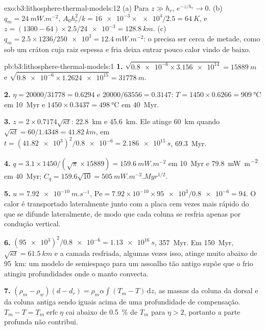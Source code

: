 \begin{solution}{exo:b3:lithosphere-thermal-models:12}
(a) Para $z \gg h_r$, $e^{-z/h_r} \to 0$. (b) $q_m = \qty{24}{mW.m^{-2}}$,
$A_0h_r^2/k = \num{16e-3}\times\num{e4}/2.5 = \qty{64}{K}$, e $z = (1300 -
64)\times2.5/\num{24e-3} = \qty{128.8}{km}$. (c) $q_m = 2.5\times1236/\num{250e3}
= \qty{12.4}{mW.m^{-2}}$: o  precisa ser cerca de metade, como sob um
cráton cuja raiz espessa e fria deixa entrar pouco calor vindo de baixo.
\end{solution}

\begin{solution}{pb:b3:lithosphere-thermal-models:1}
\textbf{1.} $\sqrt{\num{0.8e-6}\times\num{3.156e14}} = \qty{15889}{m}$ e
$\sqrt{\num{0.8e-6}\times\num{1.2624e15}} = \qty{31778}{m}$.

\textbf{2.} $\eta = 20000/31778 = 0.6294$ e $20000/63556 = 0.3147$:
$T = 1450\times0.6266 = \qty{909}{\celsius}$ em \qty{10}{Myr} e
$1450\times0.3437 = \qty{498}{\celsius}$ em \qty{40}{Myr}.

\textbf{3.} $z = 2\times0.7174\sqrt{\kappa t}$: \qty{22.8}{km} e
\qty{45.6}{km}. Ele atinge \qty{60}{km} quando $\sqrt{\kappa t} = 60/1.4348 =
\qty{41.82}{km}$, em $t = (\num{41.82e3})^2/\num{0.8e-6} = \qty{2.186e15}{s}$,
\qty{69.3}{Myr}.

\textbf{4.} $q = 3.1\times1450/(\sqrt\pi\times15889) = \qty{159.6}{mW.m^{-2}}$ em
\qty{10}{Myr} e \qty{79.8}{mW.m^{-2}} em \qty{40}{Myr}; $C_q = 159.6\sqrt{10}
= \qty{505}{mW.m^{-2}.Myr^{1/2}}$.

\textbf{5.} $u = \qty{7.92e-10}{m.s^{-1}}$, $\mathrm{Pe} = 7.92\times10^{-10}
\times\num{95e3}/\num{0.8e-6} = 94$. O calor é transportado lateralmente junto com a placa cem
vezes mais rápido do que se difunde lateralmente, de modo que cada coluna se resfria
apenas por condução vertical.

\textbf{6.} $(\num{95e3})^2/\num{0.8e-6} = \qty{1.13e16}{s}$, \qty{357}{Myr}.
Em \qty{150}{Myr}, $\sqrt{\kappa t} = \qty{61.5}{km}$ e a camada resfriada, algumas
vezes isso, atinge muito abaixo de \qty{95}{km}: um modelo de semiespaço para um assoalho tão
antigo supõe que o frio atingiu profundidades onde o manto convecta.

\textbf{7.} $(\rho_m - \rho_w)(d - d_r) = \rho_m\alpha\int(T_m - T)\,\mathrm dz$,
as massas da coluna da dorsal e da coluna antiga sendo iguais acima de uma
profundidade de compensação. $T_m - T = T_m\operatorname{erfc}\eta$ cai abaixo de
\qty{0.5}{\percent} de $T_m$ para $\eta > 2$, portanto a parte profunda não contribui.


\end{solution}

